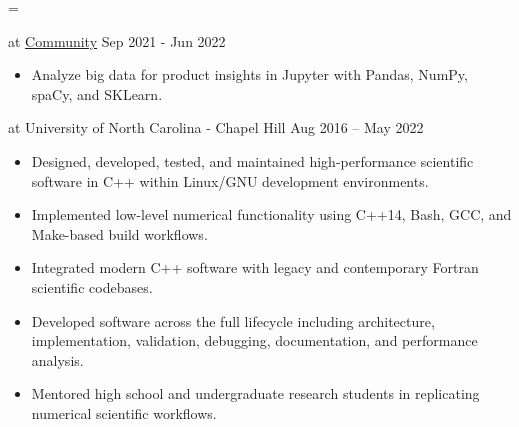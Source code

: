 \documentclass[11pt]{article}
\begin{document}
\begin{list}{}{
  \leftmargin=5pt
  \itemindent=\leftmargin
}

	\item[\bf Data Scientist] at \href{https://www.community.com/about-us}{Community} 
	\hfill {Sep 2021 - Jun 2022}
	\begin{itemize}
   \item Analyze big data for product insights in Jupyter with Pandas, NumPy, spaCy, and SKLearn.
  \end{itemize}

	\vspace{-0.5\baselineskip}

	\item[\bf Research Assistant] at University of North Carolina - Chapel Hill
	\hfill{Aug 2016 -- May 2022}\!
	\begin{itemize}
   \item Designed, developed, tested, and maintained high-performance scientific software in C++ within Linux/GNU development environments.
   \item Implemented low-level numerical functionality using C++14, Bash, GCC, and Make-based build workflows.
   \item Integrated modern C++ software with legacy and contemporary Fortran scientific codebases.
   \item Developed software across the full lifecycle including architecture, implementation, validation, debugging, documentation, and performance analysis.
   \item Mentored high school and undergraduate research students in replicating numerical scientific workflows.
  \end{itemize}
  \vspace{-0.5\baselineskip}


\end{list}
\end{document}
